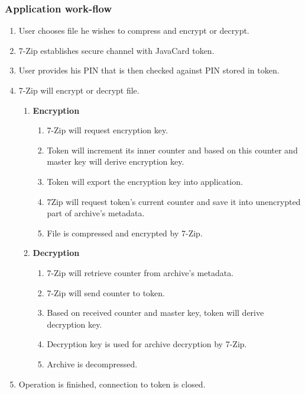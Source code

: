 \documentclass[letterpaper]{article}
\begin{document}
\subsubsection*{Application work-flow}
\begin{enumerate}
\item User chooses file he wishes to compress and encrypt or decrypt.
\item 7-Zip establishes secure channel with JavaCard token.
\item User provides his PIN that is then checked against PIN stored in token.
\item 7-Zip will encrypt or decrypt file.
	\begin{enumerate}
	\item \textbf{Encryption}
		\begin{enumerate}
		\item 7-Zip will request encryption key.
		\item Token will increment its inner counter and based on this counter 
		and master key will derive encryption key.
		\item Token will export the encryption key into application.
		\item 7Zip will request token's current counter and save it into 
		unencrypted part of archive's metadata.
		\item File is compressed and encrypted by 7-Zip.
		\end{enumerate}
	\item \textbf{Decryption}
		\begin{enumerate}
		\item 7-Zip will retrieve counter from archive's metadata.
		\item 7-Zip will send counter to token.
		\item Based on received counter and master key, token will derive decryption key.
		\item Decryption key is used for archive decryption by 7-Zip.
		\item Archive is decompressed.
		\end{enumerate}
	\end{enumerate}
\item Operation is finished, connection to token is closed.
\end{enumerate}
\end{document}
